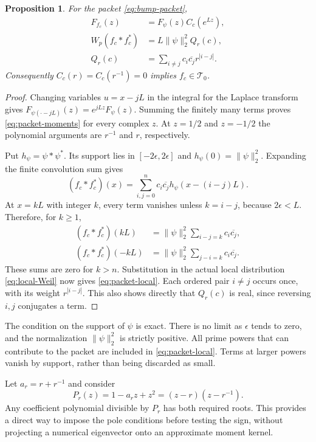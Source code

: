 \documentclass[11pt,letterpaper]{article}
\newtheorem{proposition}[theorem]{Proposition}
\theoremstyle{definition}
\theoremstyle{remark}
\newcommand{\T}{\mathcal T}
\begin{document}
\begin{proposition}
\label{prop:polarization-obstructions:bumps}
For the packet \eqref{eq:bump-packet},
\begin{align}
 F_{f_c}(z)&=F_\psi(z)C_c(e^{Lz}),
 \label{eq:packet-moments}\\
 W_p(f_c*f_c^*)&=L\|\psi\|_2^2Q_r(c),
 \label{eq:packet-local}\\
 Q_r(c)&=\sum_{i\ne j}c_i\overline{c_j}r^{|i-j|}.
 \label{eq:toeplitz}
\end{align}
Consequently $C_c(r)=C_c(r^{-1})=0$ implies $f_c\in\T_0$.
\end{proposition}
\begin{proof}
Changing variables $u=x-jL$ in the integral for the Laplace
transform gives
$F_{\psi(\cdot-jL)}(z)=e^{jLz}F_\psi(z)$.
Summing the finitely many terms proves
\eqref{eq:packet-moments} for every complex $z$.
At $z=1/2$ and $z=-1/2$ the polynomial arguments are
$r^{-1}$ and $r$, respectively.

Put $h_\psi=\psi*\psi^*$. Its support lies in
$[-2\epsilon,2\epsilon]$ and $h_\psi(0)=\|\psi\|_2^2$.
Expanding the finite convolution sum gives
\[
 (f_c*f_c^*)(x)=\sum_{i,j=0}^nc_i\overline{c_j}
 h_\psi(x-(i-j)L).
\]
At $x=kL$ with integer $k$, every term vanishes unless
$k=i-j$, because $2\epsilon<L$. Therefore, for $k\geq1$,
\begin{align*}
 (f_c*f_c^*)(kL)&=\|\psi\|_2^2\sum_{i-j=k}c_i\overline{c_j},\\
 (f_c*f_c^*)(-kL)&=\|\psi\|_2^2\sum_{j-i=k}c_i\overline{c_j}.
\end{align*}
These sums are zero for $k>n$. Substitution in the actual
local distribution \eqref{eq:local-Weil} now gives
\eqref{eq:packet-local}. Each ordered pair $i\ne j$ occurs
once, with its weight $r^{|i-j|}$. This also shows directly
that $Q_r(c)$ is real, since reversing $i,j$ conjugates a term.
\end{proof}

The condition on the support of $\psi$ is exact. There is no
limit as $\epsilon$ tends to zero, and the normalization
$\|\psi\|_2^2$ is strictly positive. All prime powers that
can contribute to the packet are included in
\eqref{eq:packet-local}. Terms at larger powers vanish by
support, rather than being discarded as small.

Let $a_r=r+r^{-1}$ and consider
\begin{equation}
 P_r(z)=1-a_rz+z^2=(z-r)(z-r^{-1}).
 \label{eq:moment-factor}
\end{equation}
Any coefficient polynomial divisible by $P_r$ has both
required roots. This provides a direct way to impose the pole
conditions before testing the sign, without projecting a
numerical eigenvector onto an approximate moment kernel.
\end{document}
